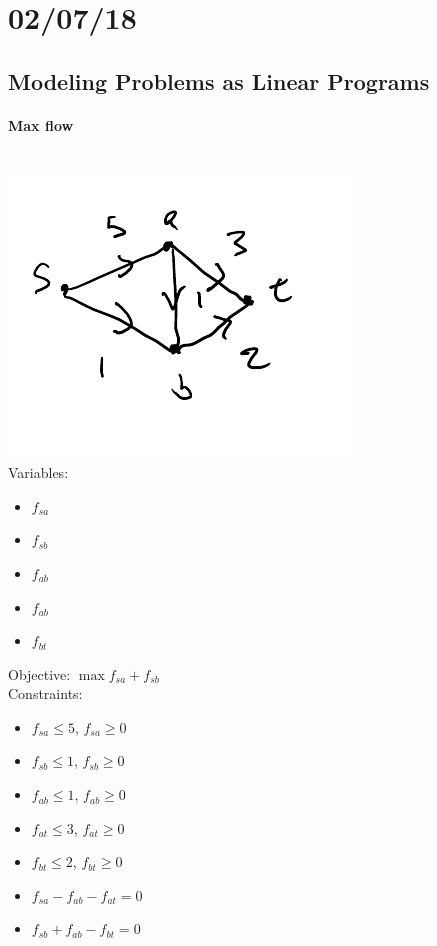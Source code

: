 \documentclass[12 pt]{article}
\begin{document}
        \section{02/07/18}
        \subsection{Modeling Problems as Linear Programs}
        \paragraph{Max flow}
        ~ \\ \includegraphics[width=.9\textwidth]{i97.pdf}
        \\Variables:
        \begin{itemize}
        \item $f_{sa}$
        \item $f_{sb}$
        \item $f_{ab}$
        \item $f_{ab}$
        \item $f_{bt}$
        \end{itemize}
        Objective: $\max f_{sa}+f_{sb}$\\
        Constraints: 
        \begin{itemize}
        \item $f_{sa} \leq 5$, $f_{sa} \geq 0$
        \item $f_{sb} \leq 1$, $f_{sb} \geq 0$
        \item $f_{ab} \leq 1$, $f_{ab} \geq 0$
        \item $f_{at} \leq 3$, $f_{at} \geq 0$
        \item $f_{bt} \leq 2$, $f_{bt} \geq 0$
        \item $f_{sa}-f_{ab}-f_{at} = 0$
        \item $f_{sb}+f_{ab}-f_{bt} = 0$
        \end{itemize}
\end{document}
